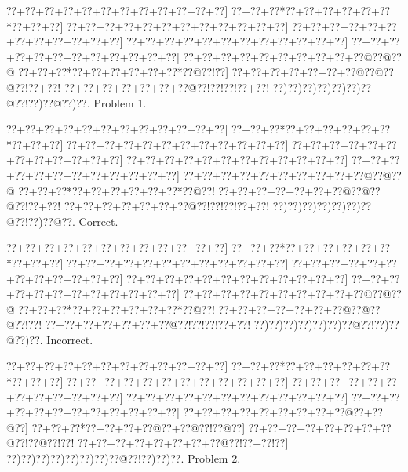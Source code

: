 \documentclass[a5paper]{article}
\begin{document}
\begin{center}
{\goo
\0??+\0??+\0??+\0??+\0??+\0??+\0??+\0??+\0??+\0??+\0??+\0??]
\0??+\0??+\0??*\0??+\0??+\0??+\0??+\0??+\0??*\0??+\0??+\0??]
\0??+\0??+\0??+\0??+\0??+\0??+\0??+\0??+\0??+\0??+\0??+\0??]
\0??+\0??+\0??+\0??+\0??+\0??+\0??+\0??+\0??+\0??+\0??+\0??]
\0??+\0??+\0??+\0??+\0??+\0??+\0??+\0??+\0??+\0??+\0??+\0??]
\0??+\0??+\0??+\0??+\0??+\0??+\0??+\0??+\0??+\0??+\0??+\0??]
\0??+\0??+\0??+\0??+\0??+\0??+\0??+\0??+\0??+\0??@\0??@\0??@
\0??+\0??+\0??*\0??+\0??+\0??+\0??+\0??+\0??*\0??@\0??!\0??]
\0??+\0??+\0??+\0??+\0??+\0??+\0??@\0??@\0??@\0??!\0??+\0??!
\0??+\0??+\0??+\0??+\0??+\0??+\0??@\0??!\0??!\0??!\0??+\0??!
\0??)\0??)\0??)\0??)\0??)\0??)\0??@\0??!\0??)\0??@\0??)\0??.
}
Problem 1.

\end{center}
\begin{center}
{\goo
\0??+\0??+\0??+\0??+\0??+\0??+\0??+\0??+\0??+\0??+\0??+\0??]
\0??+\0??+\0??*\0??+\0??+\0??+\0??+\0??+\0??*\0??+\0??+\0??]
\0??+\0??+\0??+\0??+\0??+\0??+\0??+\0??+\0??+\0??+\0??+\0??]
\0??+\0??+\0??+\0??+\0??+\0??+\0??+\0??+\0??+\0??+\0??+\0??]
\0??+\0??+\0??+\0??+\0??+\0??+\0??+\0??+\0??+\0??+\0??+\0??]
\0??+\0??+\0??+\0??+\0??+\0??+\0??+\0??+\0??+\0??+\0??+\0??]
\0??+\0??+\0??+\0??+\0??+\0??+\0??+\0??+\0??+\0??@\0??@\0??@
\0??+\0??+\0??*\0??+\0??+\0??+\0??+\0??+\0??*\0??@\0??!
\0??+\0??+\0??+\0??+\0??+\0??+\0??@\0??@\0??@\0??!\0??+\0??!
\0??+\0??+\0??+\0??+\0??+\0??+\0??@\0??!\0??!\0??!\0??+\0??!
\0??)\0??)\0??)\0??)\0??)\0??)\0??@\0??!\0??)\0??@\0??.
}
Correct. 

\end{center}
\begin{center}
{\goo
\0??+\0??+\0??+\0??+\0??+\0??+\0??+\0??+\0??+\0??+\0??+\0??]
\0??+\0??+\0??*\0??+\0??+\0??+\0??+\0??+\0??*\0??+\0??+\0??]
\0??+\0??+\0??+\0??+\0??+\0??+\0??+\0??+\0??+\0??+\0??+\0??]
\0??+\0??+\0??+\0??+\0??+\0??+\0??+\0??+\0??+\0??+\0??+\0??]
\0??+\0??+\0??+\0??+\0??+\0??+\0??+\0??+\0??+\0??+\0??+\0??]
\0??+\0??+\0??+\0??+\0??+\0??+\0??+\0??+\0??+\0??+\0??+\0??]
\0??+\0??+\0??+\0??+\0??+\0??+\0??+\0??+\0??+\0??@\0??@\0??@
\0??+\0??+\0??*\0??+\0??+\0??+\0??+\0??+\0??*\0??@\0??!
\0??+\0??+\0??+\0??+\0??+\0??+\0??@\0??@\0??@\0??!\0??!
\0??+\0??+\0??+\0??+\0??+\0??+\0??@\0??!\0??!\0??!\0??+\0??!
\0??)\0??)\0??)\0??)\0??)\0??)\0??@\0??!\0??)\0??@\0??)\0??.
}
Incorrect. 

\end{center}
\newpage
\begin{center}
{\goo
\0??+\0??+\0??+\0??+\0??+\0??+\0??+\0??+\0??+\0??+\0??+\0??]
\0??+\0??+\0??*\0??+\0??+\0??+\0??+\0??+\0??*\0??+\0??+\0??]
\0??+\0??+\0??+\0??+\0??+\0??+\0??+\0??+\0??+\0??+\0??+\0??]
\0??+\0??+\0??+\0??+\0??+\0??+\0??+\0??+\0??+\0??+\0??+\0??]
\0??+\0??+\0??+\0??+\0??+\0??+\0??+\0??+\0??+\0??+\0??+\0??]
\0??+\0??+\0??+\0??+\0??+\0??+\0??+\0??+\0??+\0??+\0??+\0??]
\0??+\0??+\0??+\0??+\0??+\0??+\0??+\0??+\0??@\0??+\0??@\0??]
\0??+\0??+\0??*\0??+\0??+\0??+\0??@\0??+\0??@\0??!\0??@\0??]
\0??+\0??+\0??+\0??+\0??+\0??+\0??+\0??@\0??!\0??@\0??!\0??!
\0??+\0??+\0??+\0??+\0??+\0??+\0??+\0??@\0??!\0??+\0??!\0??]
\0??)\0??)\0??)\0??)\0??)\0??)\0??)\0??@\0??!\0??)\0??)\0??.
}
Problem 2.

\end{center}
\end{document}

